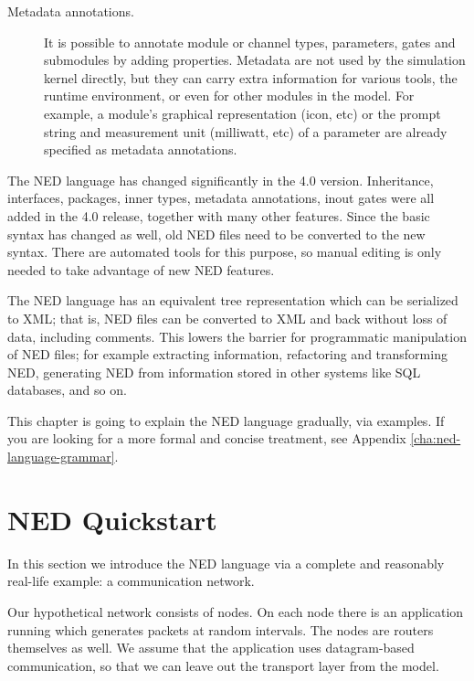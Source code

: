 \begin{description}
\item[Metadata annotations.] It is possible to annotate module or channel
types, parameters, gates and submodules by adding properties. Metadata are
not used by the simulation kernel directly, but they can carry extra
information for various tools, the runtime environment, or even for other
modules in the model. For example, a module's graphical representation
(icon, etc)  or the prompt string and measurement unit (milliwatt, etc) of a
parameter are already specified as metadata annotations.

\end{description}

\begin{note}
    The NED language has changed significantly in the 4.0 version.
    Inheritance, interfaces, packages, inner types, metadata annotations, inout
    gates were all added in the 4.0 release, together with many other features.
    Since the basic syntax has changed as well, old NED files need to be
    converted to the new syntax. There are automated tools for this purpose, so
    manual editing is only needed to take advantage of new NED features.
\end{note}

The NED language has an equivalent tree representation which can be
serialized to XML; that is, NED files can be converted to XML and back
without loss of data, including comments. This lowers the barrier for
programmatic manipulation of NED files; for example extracting information,
refactoring and transforming NED, generating NED from information stored in
other systems like SQL databases, and so on.

\begin{note}
    This chapter is going to explain the NED language gradually, via examples.
    If you are looking for a more formal and concise treatment, see
    Appendix \ref{cha:ned-language-grammar}.
\end{note}


\section{NED Quickstart}
\label{sec:ch-ned-lang:warmup}

In this section we introduce the NED language via a complete and
reasonably real-life example: a communication network.

Our hypothetical network consists of nodes. On each node there is an
application running which generates packets at random intervals.
The nodes are routers themselves as well. We assume that the application
uses datagram-based communication, so that we can leave out the
transport layer from the model.


